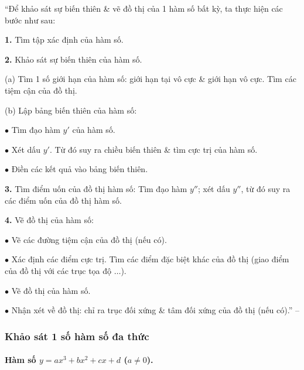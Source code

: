 \documentclass{article}
\numberwithin{equation}{section}
\begin{document}
``Để khảo sát sự biến thiên \& vẽ đồ thị của 1 hàm số bất kỳ, ta thực hiện các bước như sau:
\begin{enumerate*}
	\item[\textbf{1.}] Tìm tập xác định của hàm số.
	\item[\textbf{2.}] Khảo sát sự biến thiên của hàm số.
	\begin{enumerate*}
		\item[(a)] Tìm 1 số giới hạn của hàm số: giới hạn tại vô cực \& giới hạn vô cực. Tìm các tiệm cận của đồ thị.
		\item[(b)] Lập bảng biến thiên của hàm số:
		\begin{enumerate*}
			\item[$\bullet$] Tìm đạo hàm $y'$ của hàm số.
			\item[$\bullet$] Xét dấu $y'$. Từ đó suy ra chiều biến thiên \& tìm cực trị của hàm số.
			\item[$\bullet$] Điền các kết quả vào bảng biến thiên.
		\end{enumerate*}
	\end{enumerate*}
	\item[\textbf{3.}] Tìm điểm uốn của đồ thị hàm số: Tìm đạo hàm $y''$; xét dấu $y''$, từ đó suy ra các điểm uốn của đồ thị hàm số.
	\item[\textbf{4.}] Vẽ đồ thị của hàm số:
	\begin{enumerate*}
		\item[$\bullet$] Vẽ các đường tiệm cận của đồ thị (nếu có).
		\item[$\bullet$] Xác định các điểm cực trị. Tìm các điểm đặc biệt khác của đồ thị (giao điểm của đồ thị với các trục tọa độ $\ldots$).
		\item[$\bullet$] Vẽ đồ thị của hàm số.
		\item[$\bullet$] Nhận xét về đồ thị: chỉ ra trục đối xứng \& tâm đối xứng của đồ thị (nếu có).'' -- \cite[pp. 16--17]{TL_chuyen_Toan_Giai_Tich_12}
	\end{enumerate*}
\end{enumerate*}

\subsubsection{Khảo sát 1 số hàm số đa thức}

\paragraph{Hàm số $y = ax^3 + bx^2 + cx + d$ ($a\ne 0$).}
\end{document}
